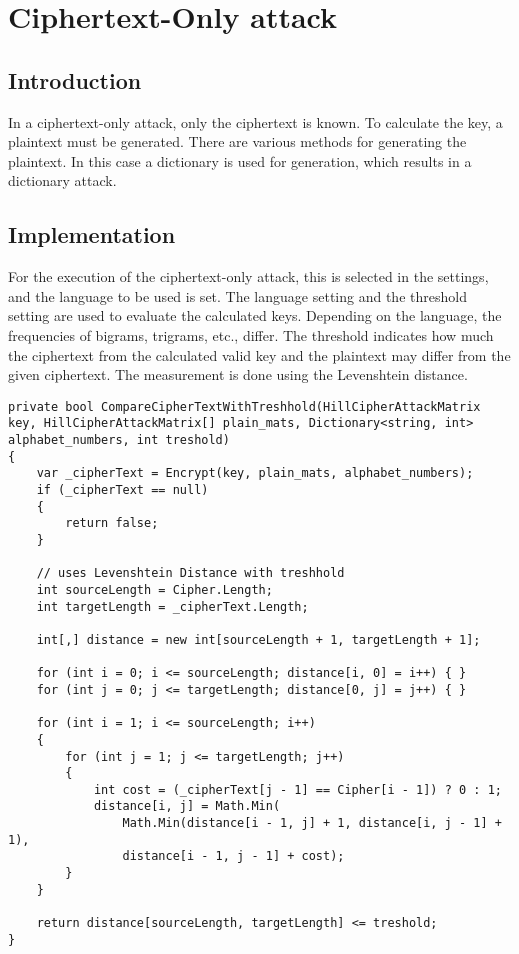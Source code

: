 \documentclass[conference]{IEEEtran}
\begin{document}
\section{Ciphertext-Only attack}
\subsection{Introduction}
In a ciphertext-only attack, only the ciphertext is known. To calculate the key, a plaintext must be generated. There are various methods for generating the plaintext. In this case a dictionary is used for generation, which results in a dictionary attack.
\subsection{Implementation}
For the execution of the ciphertext-only attack, this is selected in the settings, and the language to be used is set. The language setting and the threshold setting are used to evaluate the calculated keys. Depending on the language, the frequencies of bigrams, trigrams, etc., differ. The threshold indicates how much the ciphertext from the calculated valid key and the plaintext may differ from the given ciphertext. The measurement is done using the Levenshtein distance.

\begin{lstlisting}[caption={CompareCipherTextWithTreshhold method}, label={lst:calcDist}]
private bool CompareCipherTextWithTreshhold(HillCipherAttackMatrix key, HillCipherAttackMatrix[] plain_mats, Dictionary<string, int> alphabet_numbers, int treshold)
{
    var _cipherText = Encrypt(key, plain_mats, alphabet_numbers);
    if (_cipherText == null)
    {
        return false;
    }

    // uses Levenshtein Distance with treshhold
    int sourceLength = Cipher.Length;
    int targetLength = _cipherText.Length;

    int[,] distance = new int[sourceLength + 1, targetLength + 1];

    for (int i = 0; i <= sourceLength; distance[i, 0] = i++) { }
    for (int j = 0; j <= targetLength; distance[0, j] = j++) { }

    for (int i = 1; i <= sourceLength; i++)
    {
        for (int j = 1; j <= targetLength; j++)
        {
            int cost = (_cipherText[j - 1] == Cipher[i - 1]) ? 0 : 1;
            distance[i, j] = Math.Min(
                Math.Min(distance[i - 1, j] + 1, distance[i, j - 1] + 1),
                distance[i - 1, j - 1] + cost);
        }
    }

    return distance[sourceLength, targetLength] <= treshold;
}
\end{lstlisting}
\end{document}
